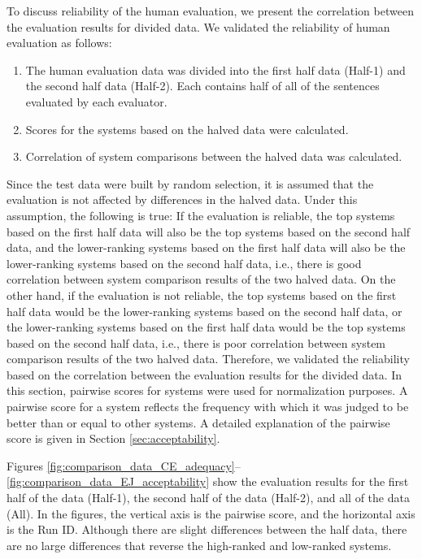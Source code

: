 \documentclass[english]{jnlp_1.4}
\begin{document}
To discuss reliability of the human evaluation, we present the correlation between the evaluation results for divided data.
We validated the reliability of human evaluation as follows: 
\begin{enumerate}
\item The human evaluation data was divided into the first half data (Half-1) and the second half data (Half-2). 
Each contains half of all of the sentences evaluated by each evaluator.
\item Scores for the systems based on the halved data were calculated. 
\item Correlation of system comparisons between the halved data was calculated. 
\end{enumerate}
Since the test data were built by random selection, it is assumed that the evaluation is not affected by differences in the halved data. 
Under this assumption, the following is true: 
If the evaluation is reliable, the top systems based on the first half data will also be the top systems based on the second half data, and the lower-ranking systems based on the first half data will also be the lower-ranking systems based on the second half data, i.e., there is good correlation between system comparison results of the two halved data. 
On the other hand, if the evaluation is not reliable, the top systems based on the first half data would be the lower-ranking systems based on the second half data, or the lower-ranking systems based on the first half data would be the top systems based on the second half data, i.e., there is poor correlation between system comparison results of the two halved data.
Therefore, we validated the reliability based on the correlation between the evaluation results for the divided data.
In this section, pairwise scores for systems were used for normalization purposes.
A pairwise score for a system reflects the frequency with which it was judged to be better than or equal to other systems. 
A detailed explanation of the pairwise score is given in Section \ref{sec:acceptability}. 

Figures \ref{fig:comparison_data_CE_adequacy}--\ref{fig:comparison_data_EJ_acceptability} show the evaluation results for the first half of the data (Half-1), the second half of the data (Half-2), and all of the data (All).
In the figures, the vertical axis is the pairwise score, and the horizontal axis is the Run ID.
Although there are slight differences between the half data, there are no large differences that reverse the high-ranked and low-ranked systems.
\end{document}
